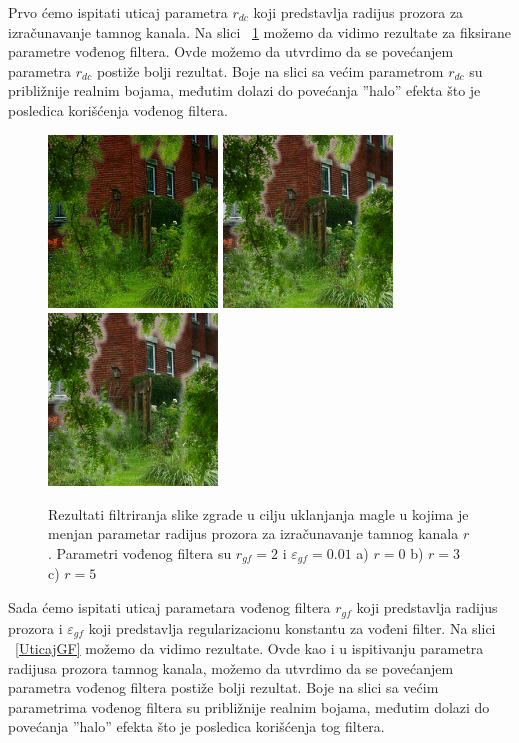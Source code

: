 \documentclass[a4paper,12pt,titlepage]{article}
\begin{document}
Prvo ćemo ispitati uticaj parametra $r_{dc}$ koji predstavlja radijus prozora za izračunavanje tamnog kanala. Na slici ~\ref{UticajRdc} možemo da vidimo rezultate za fiksirane parametre vođenog filtera. Ovde možemo da utvrdimo da se povećanjem parametra $r_{dc}$ postiže bolji rezultat. Boje na slici sa većim parametrom $r_{dc}$ su približnije realnim bojama, međutim dolazi do povećanja ''halo'' efekta što je posledica korišćenja vođenog filtera. 

\begin{figure}[ht!]
\centering
\includegraphics[width=45mm]{img/hazeResDC0.png}
\includegraphics[width=45mm]{img/hazeResDC3.png}
\includegraphics[width=45mm]{img/hazeResDC5.png}
\caption{Rezultati filtriranja slike zgrade u cilju uklanjanja magle u kojima je menjan parametar radijus prozora za izračunavanje tamnog kanala $r$. Parametri vođenog filtera su $r_{gf} = 2$ i $\varepsilon_{gf} = 0.01$ a) $r = 0$ b) $r = 3$ c) $r = 5$}
\label{UticajRdc}
\end{figure} 

Sada ćemo ispitati uticaj parametara vođenog filtera $r_{gf}$ koji predstavlja radijus prozora i $\varepsilon_{gf}$ koji predstavlja regularizacionu konstantu za vođeni filter. Na slici ~\ref{UticajGF} možemo da vidimo rezultate. Ovde kao i u ispitivanju parametra radijusa prozora tamnog kanala, možemo da utvrdimo da se povećanjem parametra vođenog filtera postiže bolji rezultat. Boje na slici sa većim parametrima vođenog filtera su približnije realnim bojama, međutim dolazi do povećanja ''halo'' efekta što je posledica korišćenja tog filtera. 
\end{document}
